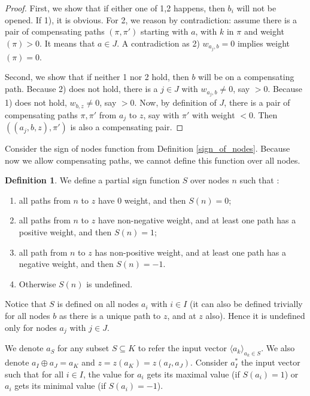 \documentclass[]{article}
\theoremstyle{definition}
\newtheorem{definition}{Definition}
\begin{document}
\begin{proof}
	First, we show that if either one of 1,2 happens, then $b_i$ will not be opened. If 1), it is obvious. For 2, we reason by contradiction: assume there is a pair of compensating paths 	$(\pi,\pi')$ starting with $a$, with $k$ in $\pi$ and weight$(\pi) > 0$. It means that $a \in J$. A contradiction as 2) $w_{a_j,b}=0$ implies weight$(\pi)=0$.
	
	Second, we show that if neither 1 nor 2 hold, then $b$ will be on a compensating path.
	Because 2) does not hold, there is a $j \in J$ with $w_{a_j,b} \neq 0$, say $>0$.
	Because 1) does not hold, $w_{b,z} \neq 0$, say $>0$.
	Now, by definition of $J$, there is a pair of compensating paths $\pi,\pi'$ 
	from $a_j$ to $z$, say with $\pi'$ with weight $<0$.
	Then $((a_j,b,z), \pi')$ is also a compensating pair.
\end{proof}

Consider the sign of nodes function from Definition \ref{sign_of_nodes}. Because now we allow compensating paths, we cannot define this function over all nodes.


\begin{definition}\label{sign_of_nodes_in_I}
	We define a partial sign function $S$ over nodes $n$ such that : 	
	\begin{enumerate} 
		 \item all paths from $n$ to $z$ have 0 weight, and then $S(n)=0$; 
		 \item all paths from $n$ to $z$ have non-negative weight, and at least one path has a positive weight, and then $S(n)=1$; 
		 \item all path from $n$ to $z$ has non-positive weight, and at least one path has a negative weight, and then $S(n)=-1$.
		 \item Otherwise $S(n)$ is undefined.
	\end{enumerate}
\end{definition}	
	
Notice that $S$ is defined on all nodes $a_i$ with $i \in I$ (it can also be defined trivially for all nodes $b$ as there is a unique path to $z$, and at $z$ also). Hence it is undefined only for nodes $a_j$ with $j \in J$.


We denote $a_S$ for any subset $S\subseteq K$ to refer the input vector $\langle a_k\rangle_{a_k\in S}$. We also denote $a_I\oplus a_J = a_K$ and $z=z(a_K)=z(a_I,a_J)$.
Consider $a_I^*$ the input vector such that for all $i \in I$, the value for $a_i$ gets its maximal value (if $S(a_i)=1$) or $a_i$ gets its minimal value (if $S(a_i)=-1$).
\end{document}
